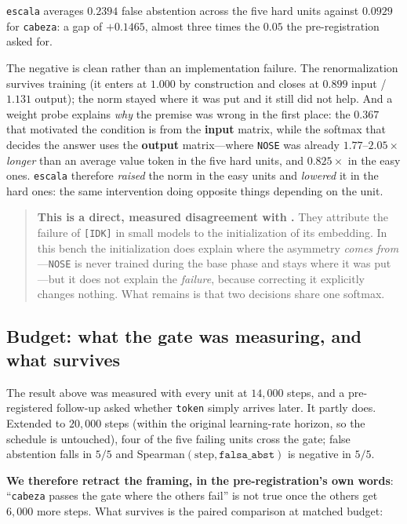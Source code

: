 \documentclass[11pt,a4paper]{article}
\begin{document}
\texttt{escala} averages $0.2394$ false abstention across the five hard units against $0.0929$ for
\texttt{cabeza}: a gap of $\mathbf{+0.1465}$, almost three times the $0.05$ the pre-registration
asked for.

The negative is clean rather than an implementation failure. The renormalization survives training
(it enters at $1.000$ by construction and closes at $0.899$ input / $1.131$ output); the norm stayed
where it was put and it still did not help. And a weight probe explains \emph{why} the premise was
wrong in the first place: the $0.367$ that motivated the condition is from the \textbf{input}
matrix, while the softmax that decides the answer uses the \textbf{output} matrix---where
\texttt{NOSE} was already $1.77$--$2.05\times$ \emph{longer} than an average value token in the five
hard units, and $0.825\times$ in the easy ones. \texttt{escala} therefore \emph{raised} the norm in
the easy units and \emph{lowered} it in the hard ones: the same intervention doing opposite things
depending on the unit.

\begin{quote}
\textbf{This is a direct, measured disagreement with \citet{cohen2024idk}.} They attribute the
failure of \texttt{[IDK]} in small models to the initialization of its embedding. In this bench the
initialization does explain where the asymmetry \emph{comes from}---\texttt{NOSE} is never trained
during the base phase and stays where it was put---but it does not explain the \emph{failure},
because correcting it explicitly changes nothing. What remains is that two decisions share one
softmax.
\end{quote}

\subsection{Budget: what the gate was measuring, and what survives}
\label{sec:presupuesto}

The result above was measured with every unit at $14{,}000$ steps, and a pre-registered follow-up
asked whether \texttt{token} simply arrives later. It partly does. Extended to $20{,}000$ steps
(within the original learning-rate horizon, so the schedule is untouched), four of the five failing
units cross the gate; false abstention falls in $5/5$ and Spearman$(\text{step}, \texttt{falsa\_abst})$
is negative in $5/5$.

\textbf{We therefore retract the framing, in the pre-registration's own words}: ``\texttt{cabeza}
passes the gate where the others fail'' is not true once the others get $6{,}000$ more steps. What
survives is the paired comparison at matched budget:
\end{document}

